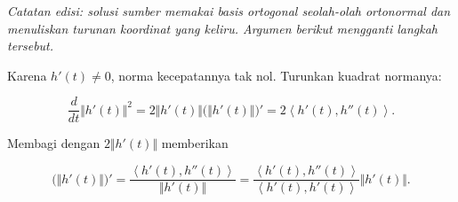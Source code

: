 
\textit{Catatan edisi: solusi sumber memakai basis ortogonal seolah-olah
ortonormal dan menuliskan turunan koordinat yang keliru. Argumen berikut
mengganti langkah tersebut.}

Karena $h'(t)\neq 0$, norma kecepatannya tak nol. Turunkan kuadrat normanya:

\[
\frac{d}{dt}\Vert h'(t)\Vert^2
=2\Vert h'(t)\Vert\bigl(\Vert h'(t)\Vert\bigr)'
=2\left\langle h'(t),h''(t)\right\rangle .
\]

Membagi dengan $2\Vert h'(t)\Vert$ memberikan

\[
\bigl(\Vert h'(t)\Vert\bigr)'
=\frac{\left\langle h'(t),h''(t)\right\rangle}{\Vert h'(t)\Vert}
=\frac{\left\langle h'(t),h''(t)\right\rangle}
       {\left\langle h'(t),h'(t)\right\rangle}\Vert h'(t)\Vert .
\]

